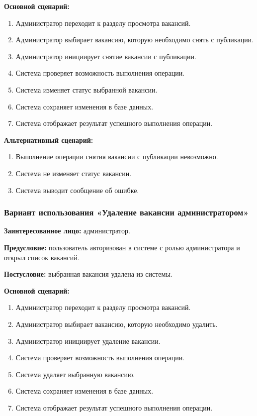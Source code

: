 \textbf{Основной сценарий:}
\begin{enumerate}
	\item Администратор переходит к разделу просмотра вакансий.
	\item Администратор выбирает вакансию, которую необходимо снять с публикации.
	\item Администратор инициирует снятие вакансии с публикации.
	\item Система проверяет возможность выполнения операции.
	\item Система изменяет статус выбранной вакансии.
	\item Система сохраняет изменения в базе данных.
	\item Система отображает результат успешного выполнения операции.
\end{enumerate}

\textbf{Альтернативный сценарий:}
\begin{enumerate}
	\item Выполнение операции снятия вакансии с публикации невозможно.
	\item Система не изменяет статус вакансии.
	\item Система выводит сообщение об ошибке.
\end{enumerate}

\subsubsection{Вариант использования «Удаление вакансии администратором»}

\textbf{Заинтересованное лицо:} администратор.

\textbf{Предусловие:} пользователь авторизован в системе с ролью администратора и открыл список вакансий.

\textbf{Постусловие:} выбранная вакансия удалена из системы.

\textbf{Основной сценарий:}
\begin{enumerate}
	\item Администратор переходит к разделу просмотра вакансий.
	\item Администратор выбирает вакансию, которую необходимо удалить.
	\item Администратор инициирует удаление вакансии.
	\item Система проверяет возможность выполнения операции.
	\item Система удаляет выбранную вакансию.
	\item Система сохраняет изменения в базе данных.
	\item Система отображает результат успешного выполнения операции.
\end{enumerate}

